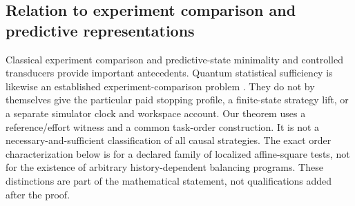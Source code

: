 \subsection*{Relation to experiment comparison and predictive representations}
Classical experiment comparison \cite{Blackwell} and predictive-state minimality and controlled transducers \cite{SC,BC} provide important antecedents. Quantum statistical sufficiency is likewise an established experiment-comparison problem \cite{Buscemi}. They do not by themselves give the particular paid stopping profile, a finite-state strategy lift, or a separate simulator clock and workspace account. Our theorem uses a reference/effort witness and a common task-order construction. It is not a necessary-and-sufficient classification of all causal strategies. The exact order characterization below is for a declared family of localized affine-square tests, not for the existence of arbitrary history-dependent balancing programs. These distinctions are part of the mathematical statement, not qualifications added after the proof.
